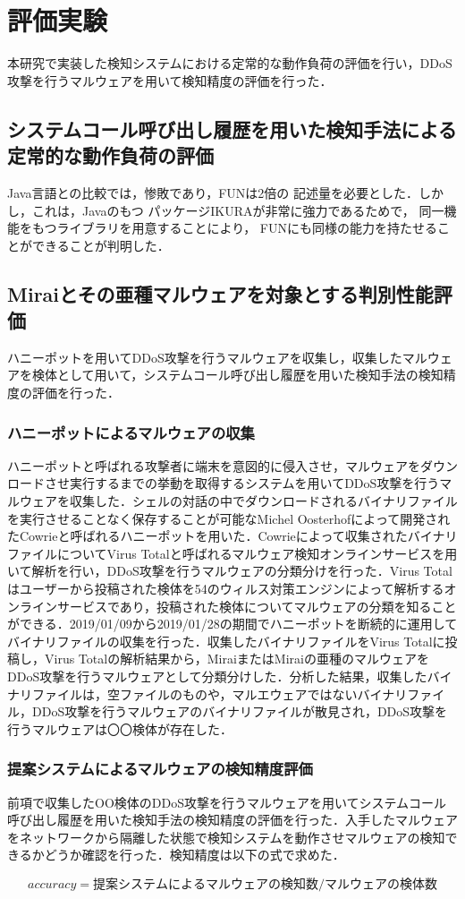 \chapter{評価実験}
本研究で実装した検知システムにおける定常的な動作負荷の評価を行い，DDoS攻撃を行うマルウェアを用いて検知精度の評価を行った．

\section{システムコール呼び出し履歴を用いた検知手法による定常的な動作負荷の評価}

Java言語との比較では，惨敗であり，FUNは2倍の
記述量を必要とした．しかし，これは，Javaのもつ
パッケージIKURAが非常に強力であるためで，
同一機能をもつライブラリを用意することにより，
FUNにも同様の能力を持たせることができることが判明した．

\section{Miraiとその亜種マルウェアを対象とする判別性能評価}
ハニーポットを用いてDDoS攻撃を行うマルウェアを収集し，収集したマルウェアを検体として用いて，システムコール呼び出し履歴を用いた検知手法の検知精度の評価を行った．

\subsection{ハニーポットによるマルウェアの収集}
ハニーポットと呼ばれる攻撃者に端末を意図的に侵入させ，マルウェアをダウンロードさせ実行するまでの挙動を取得するシステムを用いてDDoS攻撃を行うマルウェアを収集した．シェルの対話の中でダウンロードされるバイナリファイルを実行させることなく保存することが可能なMichel Oosterhofによって開発されたCowrieと呼ばれるハニーポットを用いた．Cowrieによって収集されたバイナリファイルについてVirus Totalと呼ばれるマルウェア検知オンラインサービスを用いて解析を行い，DDoS攻撃を行うマルウェアの分類分けを行った．Virus Totalはユーザーから投稿された検体を54のウィルス対策エンジンによって解析するオンラインサービスであり，投稿された検体についてマルウェアの分類を知ることができる．2019/01/09から2019/01/28の期間でハニーポットを断続的に運用してバイナリファイルの収集を行った．収集したバイナリファイルをVirus Totalに投稿し，Virus Totalの解析結果から，MiraiまたはMiraiの亜種のマルウェアをDDoS攻撃を行うマルウェアとして分類分けした．分析した結果，収集したバイナリファイルは，空ファイルのものや，マルエウェアではないバイナリファイル，DDoS攻撃を行うマルウェアのバイナリファイルが散見され，DDoS攻撃を行うマルウェアは〇〇検体が存在した．

\subsection{提案システムによるマルウェアの検知精度評価}
前項で収集したOO検体のDDoS攻撃を行うマルウェアを用いてシステムコール呼び出し履歴を用いた検知手法の検知精度の評価を行った．入手したマルウェアをネットワークから隔離した状態で検知システムを動作させマルウェアの検知できるかどうか確認を行った．検知精度は以下の式で求めた．

\begin{equation}
    accuracy = 提案システムによるマルウェアの検知数/マルウェアの検体数
\end{equation}